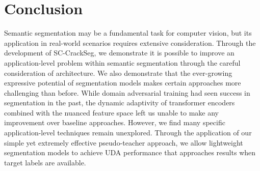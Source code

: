 \documentclass[a4paper,12pt]{report}
\begin{document}
\chapter{Conclusion}
Semantic segmentation may be a fundamental task for computer vision, but its application in real-world scenarios requires extensive consideration. Through the development of SC-CrackSeg, we demonstrate it is possible to improve an application-level problem within semantic segmentation through the careful consideration of architecture. We also demonstrate that the ever-growing expressive potential of segmentation models makes certain approaches more challenging than before. While domain adversarial training had seen success in segmentation in the past, the dynamic adaptivity of transformer encoders combined with the nuanced feature space left us unable to make any improvement over baseline approaches. However, we find many specific application-level techniques remain unexplored. Through the application of our simple yet extremely effective pseudo-teacher approach, we allow lightweight segmentation models to achieve UDA performance that approaches results when target labels are available.


{}

\end{document}
